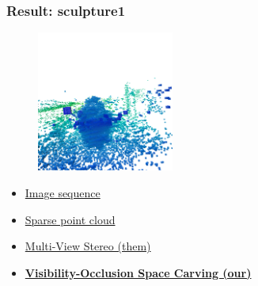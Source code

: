 \documentclass{beamer}
\begin{document}
\begin{frame}
  \frametitle{Result: sculpture1}
  \begin{figure}[htb!]
   \centering
   \includegraphics[width=0.4\textwidth]{img/sculpture1_carve2}  %
  \end{figure}
  \begin{itemize}
    \item \href{run:./vid/05-result2-seq.mp4}{Image sequence} \\
    \item \href{run:./vid/06-result2-sparse.mp4}{Sparse point cloud} \\
    \item \href{run:./vid/07-result2-mvs.mp4}{Multi-View Stereo (them)} \\
    \item \href{run:./vid/08-result2-visocc.mp4}{\textbf{Visibility-Occlusion Space Carving (our)}} \\
  \end{itemize}
\end{frame}
\end{document}
